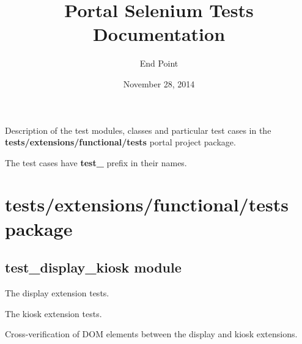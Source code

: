 \documentclass[letterpaper,10pt,english]{sphinxmanual}
\title{Portal Selenium Tests Documentation}
\date{November 28, 2014}
\author{End Point}
\begin{document}
\maketitle
\tableofcontents
{}\label{index::doc}


Description of the test modules, classes and particular test cases
in the \textbf{tests/extensions/functional/tests} portal project package.

The test cases have \textbf{test\_} prefix in their names.


\chapter{tests/extensions/functional/tests package}
\label{modules:tests-extensions-functional-tests-package}\label{modules::doc}\label{modules:portal-selenium-tests-documentation}

\section{test\_display\_kiosk module}
\label{test_display_kiosk:module-test_display_kiosk}\label{test_display_kiosk::doc}\label{test_display_kiosk:test-display-kiosk-module}
The display extension tests.

The kiosk extension tests.

Cross-verification of DOM elements between the display and kiosk extensions.
\end{document}
